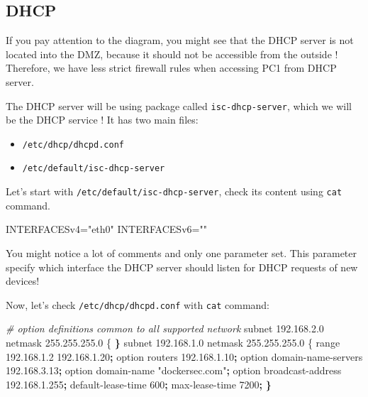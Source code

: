 \documentclass[a4paper,11pt,singlespacing]{article}
\newenvironment{Shaded}{}{}
\newcommand{\CommentTok}[1]{\textcolor[rgb]{0.38,0.63,0.69}{\textit{#1}}}
\newcommand{\ErrorTok}[1]{\textcolor[rgb]{1.00,0.00,0.00}{\textbf{#1}}}
\newcommand{\ExtensionTok}[1]{#1}
\newcommand{\KeywordTok}[1]{\textcolor[rgb]{0.00,0.44,0.13}{\textbf{#1}}}
\newcommand{\NormalTok}[1]{#1}
\newcommand{\OperatorTok}[1]{\textcolor[rgb]{0.40,0.40,0.40}{#1}}
\newcommand{\StringTok}[1]{\textcolor[rgb]{0.25,0.44,0.63}{#1}}
\newcommand{\VariableTok}[1]{\textcolor[rgb]{0.10,0.09,0.49}{#1}}
\providecommand{\tightlist}{%
  \setlength{\itemsep}{0pt}\setlength{\parskip}{0pt}}
\begin{document}
\subsection{DHCP}\label{dhcp}

If you pay attention to the diagram, you might see that the DHCP server
is not located into the DMZ, because it should not be accessible from
the outside ! Therefore, we have less strict firewall rules when
accessing PC1 from DHCP server.

The DHCP server will be using package called \texttt{isc-dhcp-server},
which we will be the DHCP service ! It has two main files:

\begin{itemize}
\tightlist
\item
  \texttt{/etc/dhcp/dhcpd.conf}
\item
  \texttt{/etc/default/isc-dhcp-server}
\end{itemize}

Let's start with \texttt{/etc/default/isc-dhcp-server}, check its
content using \texttt{cat} command.

\begin{Shaded}
\begin{Highlighting}[]
\VariableTok{INTERFACESv4}\OperatorTok{=}\StringTok{"eth0"}
\VariableTok{INTERFACESv6}\OperatorTok{=}\StringTok{""}
\end{Highlighting}
\end{Shaded}

You might notice a lot of comments and only one parameter set. This
parameter specify which interface the DHCP server should listen for DHCP
requests of new devices!

Now, let's check \texttt{/etc/dhcp/dhcpd.conf} with \texttt{cat}
command:

\begin{Shaded}
\begin{Highlighting}[]
\CommentTok{\# option definitions common to all supported network}
\ExtensionTok{subnet}\NormalTok{ 192.168.2.0 netmask 255.255.255.0 \{}
\ErrorTok{\}}
\ExtensionTok{subnet}\NormalTok{ 192.168.1.0 netmask 255.255.255.0 \{}
    \ExtensionTok{range}\NormalTok{ 192.168.1.2 192.168.1.20}\KeywordTok{;}
    \ExtensionTok{option}\NormalTok{ routers 192.168.1.10}\KeywordTok{;}
    \ExtensionTok{option}\NormalTok{ domain{-}name{-}servers 192.168.3.13}\KeywordTok{;}
    \ExtensionTok{option}\NormalTok{ domain{-}name }\StringTok{"dockersec.com"}\KeywordTok{;} 
    \ExtensionTok{option}\NormalTok{ broadcast{-}address 192.168.1.255}\KeywordTok{;}
    \ExtensionTok{default{-}lease{-}time}\NormalTok{ 600}\KeywordTok{;}
    \ExtensionTok{max{-}lease{-}time}\NormalTok{ 7200}\KeywordTok{;}
\ErrorTok{\}}
\end{Highlighting}
\end{Shaded}
\end{document}
